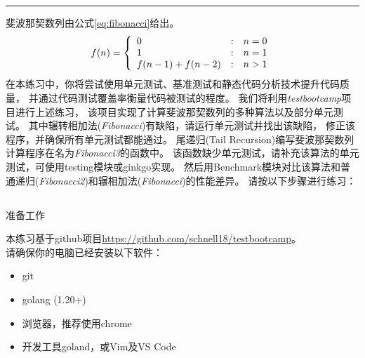 \documentclass[12pt,addpoints,fleqn]{exam}
\begin{document}
\noindent
\rule[2ex]{\textwidth}{2pt}

\newpage

\begin{questions}
  \pointsinrightmargin
  \setlength{\rightpointsmargin}{2cm}
  \CorrectChoiceEmphasis{\color{red}\itshape}

\newpage
\question[40] 斐波那契数列由公式\ref{eq:fibonacci}给出。
\begin{equation}
    \label{eq:fibonacci}
    f(n)=\left\{
        \begin{array}{l@{\quad:\quad}l}
            0  & n=0 \\
            1  & n=1 \\
            f(n-1) + f(n-2) & n>1
        \end{array}
    \right.
\end{equation}
在本练习中，你将尝试使用单元测试、基准测试和静态代码分析技术提升代码质量，
并通过代码测试覆盖率衡量代码被测试的程度。
我们将利用\emph{testbootcamp}项目进行上述练习，
该项目实现了计算斐波那契数列的多种算法以及部分单元测试。
其中辗转相加法(\emph{Fibonacci})有缺陷，请运行单元测试并找出该缺陷，
修正该程序，并确保所有单元测试都能通过。
尾递归(Tail Recursion)编写斐波那契数列计算程序在名为\emph{Fibonacci3}的函数中。
该函数缺少单元测试，请补充该算法的单元测试，可使用testing模块或ginkgo实现。
然后用Benchmark模块对比该算法和普通递归(\emph{Fibonacci2})和辗相加法(\emph{Fibonacci})的性能差异。
请按以下步骤进行练习：


\newpage
\begin{parts}
  \part{}准备工作

本练习基于github项目\href{https://github.com/schnell18/testbootcamp}{https://github.com/schnell18/testbootcamp}。\\
请确保你的电脑已经安装以下软件：

\begin{itemize}
    \item git
    \item golang (1.20+)
    \item 浏览器，推荐使用chrome
    \item 开发工具goland，或Vim及VS Code
\end{itemize}


\end{parts}
\end{questions}
\end{document}
